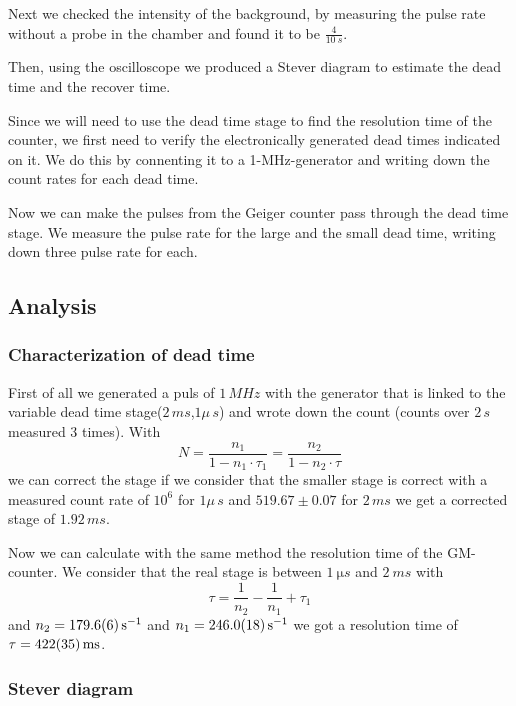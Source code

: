 Next we checked the intensity of the background, by measuring the pulse rate without a probe in the chamber and found it to be $\frac{4}{\SI{10}{s}}$.

Then, using the oscilloscope we produced a Stever diagram to estimate the dead time and the recover time.

Since we will need to use the dead time stage to find the resolution time of the counter, we first need to verify the electronically generated dead times indicated on it. We do this by connenting it to a 1-MHz-generator and writing down the count rates for each dead time.

Now we can make the pulses from the Geiger counter pass through the dead time stage. We measure the pulse rate for the large and the small dead time, writing down three pulse rate for each.

\subsection{Analysis}

\subsubsection{Characterization of dead time}

First of all we generated a puls of $1\,MHz$ with the generator
that is linked to the variable dead time stage($2\,ms$,$1\mu\,s$) and wrote down the count (counts over $2\,s$ measured $3$ times).
With
\begin{equation}
N =\frac{n_1}{1-n_1\cdot\tau_1}=\frac{n_2}{1-n_2\cdot\tau}
\end{equation}
we can correct the stage if we consider that the smaller stage is correct 
with a measured count rate of $10^6$ for $1\mu\,s$ and 
$519.67\pm0.07$ for $2\,ms$ we get a corrected stage of $1.92\,ms$.

Now we can calculate with the same method the resolution time of the GM-counter.
We consider that the real stage is between $\SI{1}{\micro s}$ and $\SI{2}{ms}$ with
\begin{equation}
\tau =\frac{1}{n_2}-\frac{1}{n_1}+\tau_1
\end{equation}
and $n_2=\SI{179.6\pm0.6}{s^{-1}}$ and $n_1=\SI{246.0\pm1.8}{s^{-1}}$ we got a resolution time of $\tau=\SI{422\pm35}{ms}$.

\subsubsection{Stever diagram}

